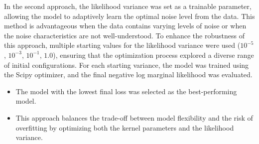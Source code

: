 In the second approach, the likelihood variance was set as a trainable parameter, allowing the model to adaptively learn the optimal noise level from the data. This method is advantageous when the data contains varying levels of noise or when the noise characteristics are not well-understood. To enhance the robustness of this approach, multiple starting values for the likelihood variance were used ($10^{-5}$, $10^{-3}$, $10^{-1}$, $1.0$), ensuring that the optimization process explored a diverse range of initial configurations. For each starting variance, the model was trained using the Scipy optimizer, and the final negative log marginal likelihood was evaluated.

\begin{itemize}
    \item The model with the lowest final loss was selected as the best-performing model.
    \item This approach balances the trade-off between model flexibility and the risk of overfitting by optimizing both the kernel parameters and the likelihood variance.
\end{itemize}

